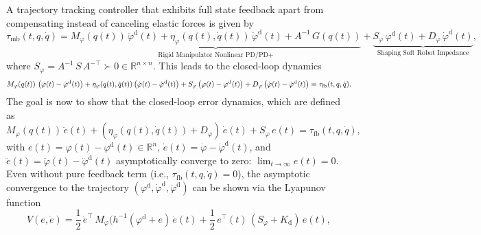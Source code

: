 A trajectory tracking controller that exhibits full state feedback apart from compensating instead of canceling elastic forces is given by~\citep{kelly1996class, della2020model}
\begin{equation}
    \tau_\mathrm{mb}(t,q,\dot{q}) = \underbrace{M_\varphi(q(t)) \, \ddot{\varphi}^\mathrm{d}(t) + \eta_\varphi(q(t),\dot{q}(t)) \, \dot{\varphi}^\mathrm{d}(t) + A^{-1} \, G(q(t))}_\text{Rigid Manipulator Nonlinear PD/PD+} + \underbrace{S_\varphi \, \varphi^\mathrm{d}(t) + D_\varphi \, \dot{\varphi}^\mathrm{d}(t)}_\text{Shaping Soft Robot Impedance},
\end{equation}
where $S_\varphi = A^{-1} \, S \, A^{-\top} \succ 0 \in \mathbb{R}^{n \times n}$.
This leads to the closed-loop dynamics
\begin{equation}\footnotesize
    M_\varphi(q(t)) \, \left ( \ddot{\varphi}(t) - \ddot{\varphi}^\mathrm{d}(t) \right ) + \eta_\varphi(q(t),\dot{q}(t)) \left ( \dot{\varphi}(t) - \dot{\varphi}^\mathrm{d}(t) \right ) + S_\varphi \left ( \varphi(t) - \varphi^\mathrm{d}(t) \right ) + D_\varphi \left ( \dot{\varphi}(t) - \dot{\varphi}^\mathrm{d}(t) \right ) = \tau_\mathrm{fb}(t,q,\dot{q}).
\end{equation}
The goal is now to show that the closed-loop error dynamics, which are defined as
\begin{equation}
    M_\varphi(q(t)) \, \ddot{e}(t) + \left ( \eta_\varphi(q(t),\dot{q}(t)) + D_\varphi \right ) \, \dot{e}(t) + S_\varphi \, e(t) = \tau_\mathrm{fb}(t,q,\dot{q}),
\end{equation}
with $e(t) = \varphi(t) - \varphi^\mathrm{d}(t) \in \mathbb{R}^n$, $\dot{e}(t) = \dot{\varphi} - \dot{\varphi}^\mathrm{d}(t)$, and $\ddot{e}(t) = \ddot{\varphi}(t) - \ddot{\varphi}^\mathrm{d}(t)$ asymptotically converge to zero: $\lim_{t \to \infty} e(t) = 0$.
Even without pure feedback term (i.e., $\tau_\mathrm{fb}(t,q,\dot{q}) = 0$), the asymptotic convergence to the trajectory $(\varphi^\mathrm{d}, \dot{\varphi}^\mathrm{d}, \ddot{\varphi}^\mathrm{d})$ can be shown via the Lyapunov function
\begin{equation}
    V(e, \dot{e}) = \frac{1}{2} \, \dot{e}^\top \, M_\varphi(h^{-1}(\varphi^\mathrm{d}+e) \, \dot{e}(t) + \frac{1}{2} \, e^\top(t) \, \left ( S_\varphi + K_\mathrm{d} \right ) \, e(t),
\end{equation}
